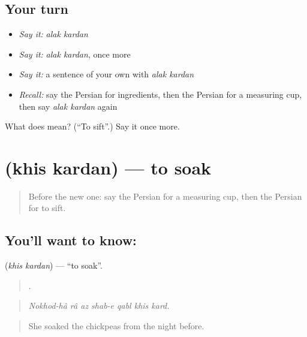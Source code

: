 \subsection*{Your turn}
\begin{itemize}
\raggedright
  \item \emph{Say it:} \emph{alak kardan}
  \item \emph{Say it:} \emph{alak kardan}, once more
  \item \emph{Say it:} a sentence of your own with \emph{alak kardan}
  \item \emph{Recall:} say the Persian for ingredients, then the Persian for a measuring cup, then say \emph{alak kardan} again
\end{itemize}

\begin{tcolorbox}[breakable,colback=teal!4,colframe=teal!35!black,title={Before you move on}]
What does   mean? (\textquotedblleft{}To sift\textquotedblright{}.) Say it once more.
\end{tcolorbox}
\section[\texorpdfstring{\fa{خیس} \fa{کردن} (khis kardan)}{خیس کردن (khis kardan)}]{  (khis kardan) — to soak}

\label{lesson:FA-C355-khis-kardan}



\begin{quote}
Before the new one: say the Persian for a measuring cup, then the Persian for to sift.
\end{quote}

\subsection*{You'll want to know:  }
\textbf{ } (\emph{khis kardan}) — \textquotedblleft{}to soak\textquotedblright{}.

\begin{quote}
      .
\end{quote}

\begin{quote}
\emph{Nokhod-hâ râ az shab-e qabl khis kard.}
\end{quote}

\begin{quote}
She soaked the chickpeas from the night before.
\end{quote}

